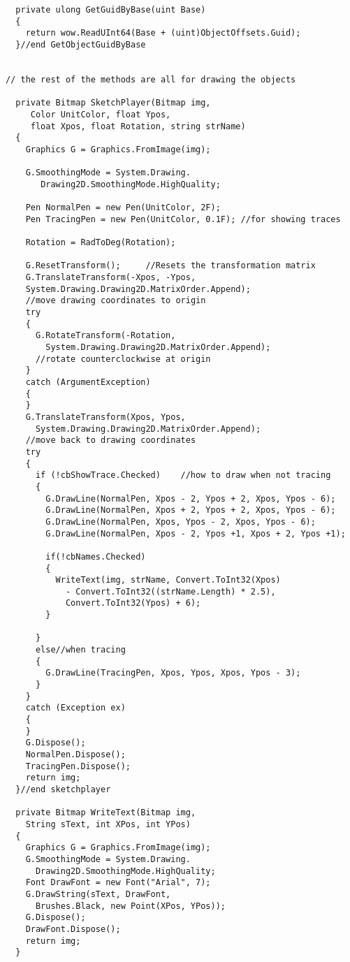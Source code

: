 \begin{lstlisting}
  private ulong GetGuidByBase(uint Base)
  {
    return wow.ReadUInt64(Base + (uint)ObjectOffsets.Guid);
  }//end GetObjectGuidByBase


// the rest of the methods are all for drawing the objects

  private Bitmap SketchPlayer(Bitmap img, 
     Color UnitColor, float Ypos, 
     float Xpos, float Rotation, string strName)
  {
    Graphics G = Graphics.FromImage(img);

    G.SmoothingMode = System.Drawing.
       Drawing2D.SmoothingMode.HighQuality;

    Pen NormalPen = new Pen(UnitColor, 2F);
    Pen TracingPen = new Pen(UnitColor, 0.1F); //for showing traces

    Rotation = RadToDeg(Rotation);

    G.ResetTransform();     //Resets the transformation matrix
    G.TranslateTransform(-Xpos, -Ypos, 
    System.Drawing.Drawing2D.MatrixOrder.Append);        
    //move drawing coordinates to origin
    try
    {
      G.RotateTransform(-Rotation, 
        System.Drawing.Drawing2D.MatrixOrder.Append);          
      //rotate counterclockwise at origin
    }
    catch (ArgumentException)
    {
    }
    G.TranslateTransform(Xpos, Ypos,
      System.Drawing.Drawing2D.MatrixOrder.Append);           
    //move back to drawing coordinates
    try
    {
      if (!cbShowTrace.Checked)    //how to draw when not tracing
      {
        G.DrawLine(NormalPen, Xpos - 2, Ypos + 2, Xpos, Ypos - 6);
        G.DrawLine(NormalPen, Xpos + 2, Ypos + 2, Xpos, Ypos - 6);
        G.DrawLine(NormalPen, Xpos, Ypos - 2, Xpos, Ypos - 6);
        G.DrawLine(NormalPen, Xpos - 2, Ypos +1, Xpos + 2, Ypos +1);

        if(!cbNames.Checked)
        {
          WriteText(img, strName, Convert.ToInt32(Xpos) 
            - Convert.ToInt32((strName.Length) * 2.5), 
            Convert.ToInt32(Ypos) + 6);
        }

      }
      else//when tracing
      {
        G.DrawLine(TracingPen, Xpos, Ypos, Xpos, Ypos - 3);
      }
    }
    catch (Exception ex)
    {
    }
    G.Dispose();
    NormalPen.Dispose();
    TracingPen.Dispose();
    return img;
  }//end sketchplayer 

  private Bitmap WriteText(Bitmap img, 
    String sText, int XPos, int YPos)
  {
    Graphics G = Graphics.FromImage(img);
    G.SmoothingMode = System.Drawing.
      Drawing2D.SmoothingMode.HighQuality;
    Font DrawFont = new Font("Arial", 7);
    G.DrawString(sText, DrawFont, 
      Brushes.Black, new Point(XPos, YPos));
    G.Dispose();
    DrawFont.Dispose();
    return img;
  }


\end{lstlisting}
